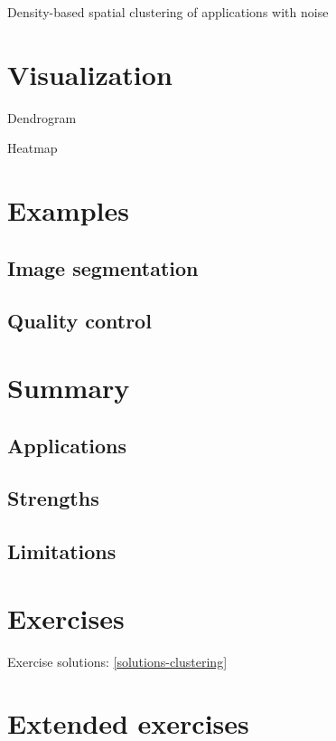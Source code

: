 \documentclass[]{book}
\theoremstyle{definition}
\theoremstyle{definition}
\theoremstyle{remark}
\begin{document}
Density-based spatial clustering of applications with noise

\section{Visualization}\label{visualization}

Dendrogram

Heatmap

\section{Examples}\label{examples}

\subsection{Image segmentation}\label{image-segmentation}

\subsection{Quality control}\label{quality-control}

\section{Summary}\label{summary}

\subsection{Applications}\label{applications}

\subsection{Strengths}\label{strengths}

\subsection{Limitations}\label{limitations}

\section{Exercises}\label{exercises}

Exercise solutions: \ref{solutions-clustering}

\section{Extended exercises}\label{extended-exercises}
\end{document}
